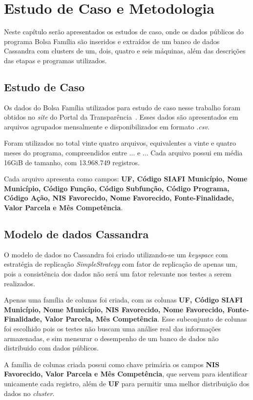 

\chapter{Estudo de Caso e Metodologia}

Neste capítulo serão apresentados os estudos de caso, onde os dados públicos do programa Bolsa Família são inseridos e extraídos de um banco de dados Cassandra com clusters de um, dois, quatro e seis máquinas, além das descrições das etapas e programas utilizados.

\section{Estudo de Caso}
Os dados do Bolsa Família utilizados para estudo de caso nesse trabalho foram obtidos no \emph{site} do Portal da Transparência~\cite{portaltransparencia}. Esses dados são apresentados em arquivos agrupados mensalmente e disponibilizados em formato \emph{.csv}. 

Foram utilizados no total vinte quatro arquivos, equivalentes a vinte e quatro meses do programa, compreendidos entre ... e ... Cada arquivo possui em média 16GiB de tamanho, com 13.968.749 registros.

Cada arquivo apresenta como campos: \textbf{UF, Código SIAFI Município, Nome Município, Código Função, Código Subfunção, Código Programa, Código Ação, NIS Favorecido, Nome Favorecido, Fonte-Finalidade, Valor Parcela e Mês Competência}. 


\section{Modelo de dados Cassandra}
O modelo de dados no Cassandra foi criado utilizando-se um \emph{keyspace} com estratégia de replicação \emph{SimpleStrategy} com fator de replicação de apenas um, pois a consistência dos dados não será um fator relevante nos testes a serem realizados.

Apenas uma família de colunas foi criada, com as colunas \textbf{UF, Código SIAFI Município, Nome Município, NIS Favorecido, Nome Favorecido, Fonte-Finalidade, Valor Parcela, Mês Competência}. Esse subconjunto de colunas foi escolhido pois os testes não buscam uma análise real das informações armazenadas, e sim mensurar o desempenho de um banco de dados não distribuido com dados públicos.

A família de colunas criada possui como chave primária os campos \textbf{NIS Favorecido, Valor Parcela e Mês Competência}, que servem para identificar unicamente cada registro, além de \textbf{UF} para permitir uma melhor distribuição dos dados no \emph{cluster}.

